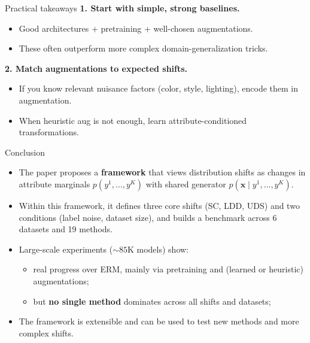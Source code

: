 \documentclass[10pt]{beamer}
\begin{document}
\begin{frame}{Practical takeaways}
\textbf{1. Start with simple, strong baselines.}
\begin{itemize}
  \item Good architectures + pretraining + well-chosen augmentations.
  \item These often outperform more complex domain-generalization tricks.
\end{itemize}

\medskip
\textbf{2. Match augmentations to expected shifts.}
\begin{itemize}
  \item If you know relevant nuisance factors (color, style, lighting), encode them in augmentation.
  \item When heuristic aug is not enough, learn attribute-conditioned transformations.
\end{itemize}

\end{frame}

\begin{frame}{Conclusion}
\begin{itemize}
  \item The paper proposes a \textbf{framework} that views distribution shifts as changes in attribute marginals $p(y^1,\dots,y^K)$ with shared generator $p(\mathbf{x}\mid y^1,\dots,y^K)$.
  \item Within this framework, it defines three core shifts (SC, LDD, UDS) and two conditions (label noise, dataset size), and builds a benchmark across 6 datasets and 19 methods.
  \item Large-scale experiments ($\sim 85$K models) show:
  \begin{itemize}
    \item real progress over ERM, mainly via pretraining and (learned or heuristic) augmentations;
    \item but \textbf{no single method} dominates across all shifts and datasets;
  \end{itemize}
  \item The framework is extensible and can be used to test new methods and more complex shifts.
\end{itemize}
\end{frame}
\end{document}
